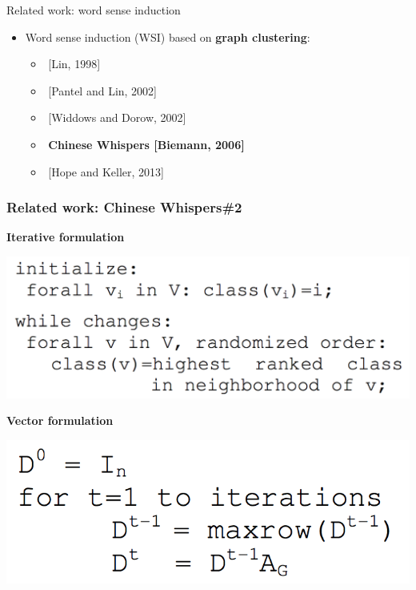 \begin{frame}{Related work: word sense induction}

\begin{itemize}
	\item Word sense induction (WSI) based on \alert{\textbf{graph clustering}}:  
	\begin{itemize}
	\item $ $ [Lin, 1998]
	\item $ $ [Pantel and Lin, 2002]
	\item $ $ [Widdows and Dorow, 2002]
	\item $ $ \textbf{Chinese Whispers [Biemann, 2006]}
	\item $ $ [Hope and Keller, 2013]
	\end{itemize}
	
\end{itemize}
	

\end{frame}


%
% 




\begin{frame}[fragile]
\frametitle{Related work: Chinese Whispers\#2}

 \textbf{Iterative formulation}~\cite{biemann2006chinese}
 \begin{center}
 \includegraphics[height=0.25\textwidth]{figures/cw-simple}
\end{center}
 
 \pause 
 
 \textbf{Vector formulation}~\cite{biemann2006chinese}
 
 \begin{center}
 \includegraphics[height=0.18\textwidth]{figures/cw-vector}
 \end{center}
 
\end{frame}



